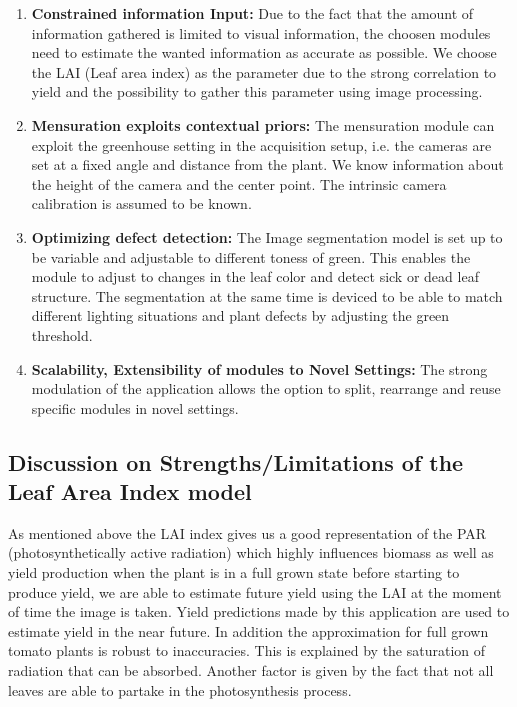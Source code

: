 \begin{enumerate}
    \item \textbf{Constrained information Input:} Due to the fact that the amount of information gathered is limited to visual information, the choosen modules need to estimate the wanted information as accurate as possible. We choose the LAI (Leaf area index) as the parameter due to the strong correlation to yield \cite{heuvelink2004effect} and the possibility to gather this parameter using image processing.

    \item \textbf{Mensuration exploits contextual priors:} The mensuration module can exploit the greenhouse setting in the acquisition setup, i.e. the cameras are set at a fixed angle and distance from the plant. We know information about the height of the camera and the center point. The intrinsic camera calibration is assumed to be known.

    \item \textbf{Optimizing defect detection:} The Image segmentation model is set up to be variable and adjustable to different toness of green. This enables the module to adjust to changes in the leaf color and detect sick or dead leaf structure. The segmentation at the same time is deviced to be able to match different lighting situations and plant defects by adjusting the green threshold.

    \item \textbf{Scalability, Extensibility of modules to Novel Settings:} The strong modulation of the application allows the option to split, rearrange and reuse specific modules in novel settings.
\end{enumerate}

\subsection{Discussion on Strengths/Limitations of the Leaf Area Index model}

As mentioned above the LAI index gives us a good representation of the PAR (photosynthetically active radiation) which highly influences biomass as well as yield production
\cite{hossain2017leaf} when the plant is in a full grown state before starting to produce yield, we are able to
estimate future yield using the LAI at the moment of time the image is taken. Yield predictions made by this
application are used to estimate yield in the near future. In addition the approximation for full grown tomato 
plants is robust to inaccuracies. This is explained by the saturation of radiation that can be absorbed.
Another factor is given by the fact that not all leaves are able to partake in the photosynthesis process.\\

